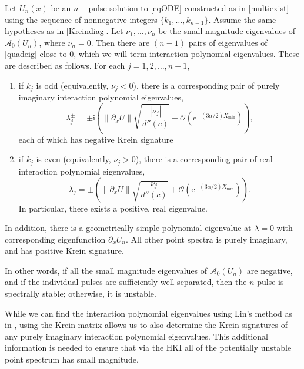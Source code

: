 \documentclass[review,onefignum,onetabnum]{siamart171218}
\newcommand{\rme}{\mathrm{e}}
\newcommand{\rmi}{\mathrm{i}}
\newcommand{\calA}{\mathcal{A}}
\begin{document}
\begin{corollary}\label{stabcrit}
Let $U_n(x)$ be an $n-$pulse solution to \cref{eqODE} constructed as in \cref{multiexist} using the sequence of nonnegative integers $\{ k_1, \dots, k_{n-1} \}$. Assume the same hypotheses as in \cref{Kreindiag}. Let $\nu_1, \dots, \nu_n$ be the small magnitude eigenvalues of $\calA_0(U_n)$, where $\nu_n = 0$. Then there are $(n-1)$ pairs of eigenvalues of \cref{quadeig} close to 0, which we will term interaction polynomial eigenvalues. These are described as follows. For each $j=1,2,\dots,n-1$,
\begin{enumerate}
  \item if $k_j$ is odd (equivalently, $\nu_j<0$), there is a corresponding pair of purely imaginary interaction polynomial eigenvalues,
  \begin{equation}\label{npulseKreineigs}
	\lambda_j^\pm = \pm \rmi \left( \|\partial_xU\| \sqrt{ \frac{|\nu_j|}{d''(c)} } + \mathcal{O}(\rme^{-(3 \alpha/2) X_{\mathrm{min}}}) \right),
	\end{equation}
  each of which has negative Krein signature
  \item if $k_j$ is even (equivalently, $\nu_j>0$), there is a corresponding pair of real interaction polynomial eigenvalues,
   	\[
	\lambda_j = \pm \left( \|\partial_xU\| \sqrt{ \frac{\nu_j}{d''(c)} } + \mathcal{O}(\rme^{-(3 \alpha/2) X_{\mathrm{min}}}) \right).
	\]
  In particular, there exists a positive, real eigenvalue.
\end{enumerate}
In addition, there is a geometrically simple polynomial eigenvalue at $\lambda=0$ with corresponding eigenfunction $\partial_x U_n$. All other point spectra is purely imaginary, and has positive Krein signature.
\end{corollary}

\begin{remark}
In other words, if all the small magnitude eigenvalues of $\calA_0(U_n)$ are negative, and if the individual pulses are sufficiently well-separated, then the $n$-pulse is spectrally stable; otherwise, it is unstable.
\end{remark}

While we can find the interaction polynomial eigenvalues using Lin's method as in \cite{sandstede:som98}, using the Krein matrix allows us to also determine the Krein signatures of any purely imaginary interaction polynomial eigenvalues. This additional information is needed to ensure that via the HKI all of the potentially unstable point spectrum has small magnitude.
\end{document}
